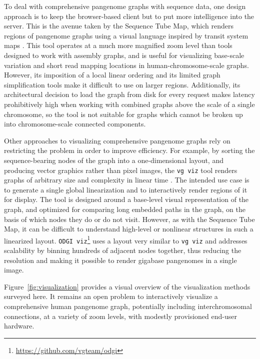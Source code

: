To deal with comprehensive pangenome graphs with sequence data, one design approach is to keep the browser-based client but to put more intelligence into the server.
This is the avenue taken by the Sequence Tube Map, which renders regions of pangenome graphs using a visual language inspired by transit system maps \citep{Beyer_2019}.
This tool operates at a much more magnified zoom level than tools designed to work with assembly graphs, and is useful for visualizing base-scale variation and short read mapping locations in human-chromosome-scale graphs.
However, its imposition of a local linear ordering and its limited graph simplification tools make it difficult to use on larger regions.
Additionally, its architectural decision to load the graph from disk for every request makes latency prohibitively high when working with combined graphs above the scale of a single chromosome, so the tool is not suitable for graphs which cannot be broken up into chromosome-scale connected components. 

Other approaches to visualizing comprehensive pangenome graphs rely on restricting the problem in order to improve efficiency.
For example, by sorting the sequence-bearing nodes of the graph into a one-dimensional layout, and producing vector graphics rather than pixel images, the \texttt{vg viz} tool renders graphs of arbitrary size and complexity in linear time \citep{Garrison_2019}. 
The intended use case is to generate a single global linearization and to interactively render regions of it for display.
The tool is designed around a base-level visual representation of the graph, and optimized for comparing long embedded paths in the graph, on the basis of which nodes they do or do not visit. 
However, as with the Sequence Tube Map, it can be difficult to understand high-level or nonlinear structures in such a linearized layout. 
\texttt{ODGI viz}\footnote{\url{https://github.com/vgteam/odgi}} uses a layout very similar to \texttt{vg viz} and addresses scalability by binning hundreds of adjacent nodes together, thus reducing the resolution and making it possible to render gigabase pangenomes in a single image.

Figure~\ref{fig:visualization} provides a visual overview of the visualization methods surveyed here.
It remains an open problem to interactively visualize a comprehensive human pangenome graph, potentially including interchromosomal connections, at a variety of zoom levels, with modestly provisioned end-user hardware.

